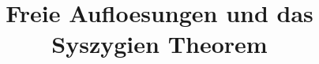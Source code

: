 \usepackage[left=3cm,right=3cm]{geometry}
\usepackage[T1]{fontenc}
\usepackage{lmodern}
\usepackage{standalone}






\usepackage[ngerman]{babel}
\renewcommand{\id}{\ensuremath{Id}}
\renewcommand{\familydefault}{\rmdefault}

\title{Freie Aufloesungen und das Syszygien Theorem}




